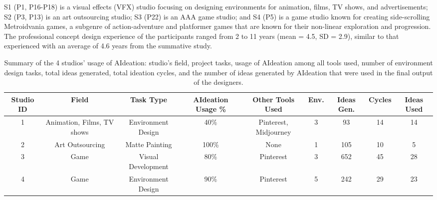 S1 (P1, P16-P18) is a visual effects (VFX) studio focusing on designing environments for animation, films, TV shows, and advertisements; S2 (P3, P13) is an art outsourcing studio; S3 (P22) is an AAA game studio; and S4 (P5) is a game studio known for creating side-scrolling Metroidvania games, a subgenre of action-adventure and platformer games that are known for their non-linear exploration and progression. The professional concept design experience of the participants ranged from 2 to 11 years (mean = 4.5, SD = 2.9), similar to that experienced with an average of 4.6 years from the summative study. 

\begin{table*}[t]
\centering
\footnotesize
\begin{tabular}{|c|c|c|c|c|c|c|c|c|}
\hline
Studio ID  & Field & Task Type & AIdeation Usage \% & Other Tools Used & Env. & Ideas Gen. & Cycles & Ideas Used\\
\hline
1  & Animation, Films, TV shows &Environment Design & 40\% & Pinterest, Midjourney & 3 & 93 & 14 & 14\\
\hline
2  & Art Outsourcing &Matte Painting & 100\% & None & 1 & 105 & 10 & 5\\
\hline
3 & Game & Visual Development & 80\% & Pinterest & 3 & 652 & 45 & 28 \\
\hline
4  & Game & Environment Design & 90\% & Pinterest & 5 & 242 & 29 & 23 \\
\hline
\end{tabular}
\caption{Summary of the 4 studios' usage of AIdeation: studio's field, project tasks, usage of AIdeation among all tools used, number of environment design tasks, total ideas generated, total ideation cycles, and the number of ideas generated by AIdeation that were used in the final output of the designers.}
\end{table*}
